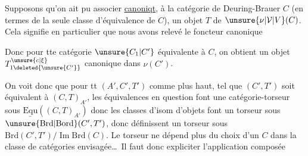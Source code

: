 
Supposons qu'on ait pu associer \uline{canoniqt},
à la catégorie de Deuring-Brauer $C$ (en termes de
la seule classe d'équivalence de $C$), un objet
$T$ de $\unsure{\nu|\mathcal V|V}(C)$. Cela signifie en particulier que
nous avons relevé le foncteur canonique 


Donc pour tte catégorie $\unsure{C_1|C'}$ équivalente à $C$,
on obtient un objet $T_{1\deleted{\unsure{C'}}}^{\unsure{c|\xi}}$ canonique dans $\nu(C')$.

On voit donc que pour tt $(A',C',T')$ comme
plus haut,  tel que $(C',T')$ soit
équivalent à $(C,T)_{A'}$, les équivalences
en question font une catégorie-torseur sous
$\underline{\mathrm{Equ}}((C,T)_{A'})$  donc 
les classes d'isom d'objets font
un torseur sous 
$\unsure{\mathrm{Brd}|\mathrm{Bord}}(C',T')$, donc définissent un torseur sous
$\mathrm{Brd}(C',T')/\operatorname{Im}\mathrm{Brd}(C)$. Le torseur ne dépend
plus du choix d'un $C$ dans la classe
de catégories envisagée\ldots\ Il faut donc expliciter
l'application composée

